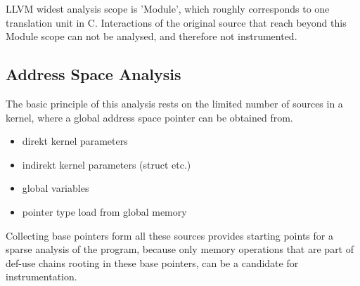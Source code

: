 LLVM widest analysis scope is 'Module', which roughly corresponds to one translation unit in C. Interactions of the original source that reach beyond this Module scope can not be analysed, and therefore not instrumented.

\subsection{Address Space Analysis}\label{pa}
The basic principle of this analysis rests on the limited number of sources in 
a kernel, where a global address space pointer can be obtained from.
\begin{itemize}
	\item direkt kernel parameters
	\item indirekt kernel parameters (struct etc.)
	\item global variables
	\item pointer type load from global memory
\end{itemize}
Collecting base pointers form all these sources provides starting points for a sparse analysis of the program,
because only memory operations that are part of def-use chains rooting in these base pointers, can be a candidate for instrumentation.




